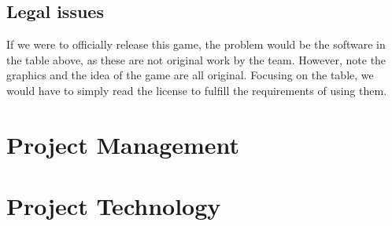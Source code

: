 \documentclass{article}
\renewcommand{\_}{\char`_}
\begin{document}
\subsection{Legal issues}
If we were to officially release this game, the problem would be the software in the table above,
as these are not original work by the team. However, note the graphics and the idea of the game are all original. Focusing on the table, we would have to simply read the license to fulfill the requirements of using them.

\section{Project Management}

\section{Project Technology}



\end{document}
